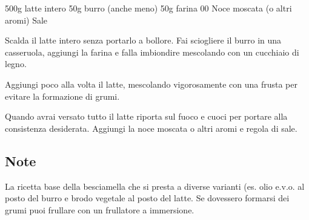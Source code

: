 \label{besciamella}
\serves{-}%
\begin{ingreds}
	500g latte intero
	50g burro (anche meno)
	50g farina 00
	Noce moscata (o altri aromi)
	Sale


\end{ingreds}

\begin{method}
Scalda il latte intero senza portarlo a bollore. Fai sciogliere il burro in una casseruola, aggiungi la farina e falla imbiondire mescolando con un cucchiaio di legno.

Aggiungi poco alla volta il latte, mescolando vigorosamente con una frusta per evitare la formazione di grumi.

Quando avrai versato tutto il latte riporta sul fuoco e cuoci per portare alla consistenza desiderata. Aggiungi la noce moscata o altri aromi e regola di sale.

\end{method}

\subsection*{Note}
La ricetta base della besciamella che si presta a diverse varianti (es. olio e.v.o. al posto del burro e brodo vegetale al posto del latte. Se dovessero formarsi dei grumi puoi frullare con un frullatore a immersione.



